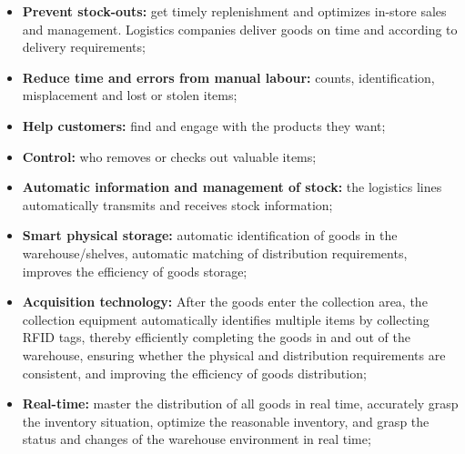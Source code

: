 
\begin{itemize}
  \item \textbf{Prevent stock-outs:} get timely replenishment 
  and optimizes in-store sales and management. Logistics 
  companies deliver goods on time and according to delivery 
  requirements;
  \item \textbf{Reduce time and errors from manual labour:} 
  counts, identification, misplacement and lost or stolen items;
  \item \textbf{Help customers:} find and engage with the 
  products they want;
  \item \textbf{Control:} who removes or checks out valuable 
  items;
  \item \textbf{Automatic information and management of stock:} 
  the logistics lines automatically transmits and receives 
  stock information;
  \item \textbf{Smart physical storage:} automatic 
  identification of goods in the warehouse/shelves, 
  automatic matching of distribution requirements, improves 
  the efficiency of goods storage;
  \item \textbf{Acquisition technology:} After the goods enter 
  the collection area, the collection equipment automatically 
  identifies multiple items by collecting RFID tags, thereby 
  efficiently completing the goods in and out of the warehouse, 
  ensuring whether the physical and distribution requirements 
  are consistent, and improving the efficiency of goods 
  distribution;
  \item \textbf{Real-time:} master the distribution of all 
  goods in real time, accurately grasp the inventory situation, 
  optimize the reasonable inventory, and grasp the status and 
  changes of the warehouse environment in real time;
\end{itemize}

